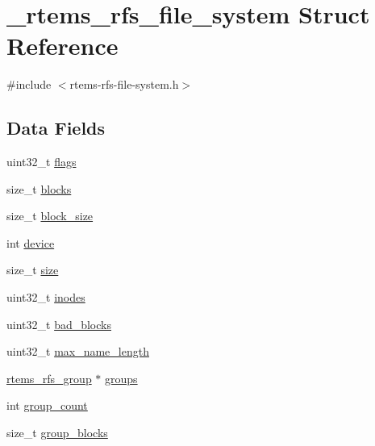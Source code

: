 \hypertarget{struct__rtems__rfs__file__system}{}\section{\+\_\+rtems\+\_\+rfs\+\_\+file\+\_\+system Struct Reference}
\label{struct__rtems__rfs__file__system}


{\ttfamily \#include $<$rtems-\/rfs-\/file-\/system.\+h$>$}

\subsection*{Data Fields}
\begin{DoxyCompactItemize}
\item 
uint32\+\_\+t \mbox{\hyperlink{struct__rtems__rfs__file__system_a91f65ae14787a7fe852b91118f732d35}{flags}}
\item 
size\+\_\+t \mbox{\hyperlink{struct__rtems__rfs__file__system_a7350984d3e2c1a22bc4063c26d37eec1}{blocks}}
\item 
size\+\_\+t \mbox{\hyperlink{struct__rtems__rfs__file__system_ac34b3180a23364ae309ba9c0d5eece13}{block\+\_\+size}}
\item 
int \mbox{\hyperlink{struct__rtems__rfs__file__system_a65d6c004f5c8678402f8957c51a14376}{device}}
\item 
size\+\_\+t \mbox{\hyperlink{struct__rtems__rfs__file__system_a581ec59c2c06db50235147913d23a2d4}{size}}
\item 
uint32\+\_\+t \mbox{\hyperlink{struct__rtems__rfs__file__system_ac4ba33f3035463da2a8a8052d6031aa0}{inodes}}
\item 
uint32\+\_\+t \mbox{\hyperlink{struct__rtems__rfs__file__system_a9dcba52af535467ff8b7b8879621fcea}{bad\+\_\+blocks}}
\item 
uint32\+\_\+t \mbox{\hyperlink{struct__rtems__rfs__file__system_ad10198223df426e678d51a1ea3a86561}{max\+\_\+name\+\_\+length}}
\item 
\mbox{\hyperlink{group__rtems__rfs_ga0e7b27c60e21039ef07a8c843fa8a3e5}{rtems\+\_\+rfs\+\_\+group}} $\ast$ \mbox{\hyperlink{struct__rtems__rfs__file__system_a299c499dd6d23501bc4f2c64f382d94d}{groups}}
\item 
int \mbox{\hyperlink{struct__rtems__rfs__file__system_aad9bb4ef4afc6d1d36015d39481b70b9}{group\+\_\+count}}
\item 
size\+\_\+t \mbox{\hyperlink{struct__rtems__rfs__file__system_a99f2245081523d8d3254b554b1bc995d}{group\+\_\+blocks}}

\end{DoxyCompactItemize}
